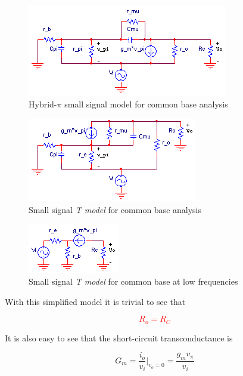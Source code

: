 \begin{figure}[h]
	\centering
		\includegraphics{schematics/ss_commonbase_hybrid_pi.PNG}
	\caption{Hybrid-$\pi$ small signal model for common base analysis}
	\label{fig:ss_commonbase_hybrid_pi}
\end{figure}

\begin{figure}[h]
	\centering
		\includegraphics{schematics/ss_commonbase_T_model.PNG}
	\caption{Small signal \textsl{T model} for common base analysis}
	\label{fig:ss_commonbase_T_model}
\end{figure}

\begin{figure}[h]
	\centering
		\includegraphics{schematics/ss_commonbase_T_model_approx.PNG}
	\caption{Small signal \textsl{T model} for common base at low frequencies}
	\label{fig:ss_commonbase_T_model_approx}
\end{figure}

With this simplified model it is trivial to see that

\textcolor{red}{
\begin{equation}
R_{o} = R_{C}
\label{eq:common_base_Ro}
\end{equation}
}

\noindent It is also easy to see that the short-circuit transconductance is

\begin{equation}
G_{m} = \frac{i_{o}}{v_{i}}|_{v_{o}=0} = \frac{g_{m}v_{\pi}}{v_{i}}
\label{eq:commonbase_Gm_initial}
\end{equation}

